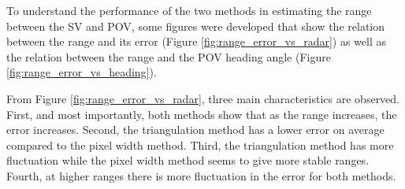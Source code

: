 To understand the performance of the two methods in estimating the range between the SV and POV, some figures were developed that show the relation between the range and its error (Figure \ref{fig:range_error_vs_radar}) as well as the relation between the range and the POV heading angle (Figure \ref{fig:range_error_vs_heading}). 

From Figure \ref{fig:range_error_vs_radar}, three main characteristics are observed. First, and most importantly, both methods show that as the range increases, the error increases. Second, the triangulation method has a lower error on average compared to the pixel width method. Third, the triangulation method has more fluctuation while the pixel width method seems to give more stable ranges. Fourth, at higher ranges there is more fluctuation in the error for both methods.

